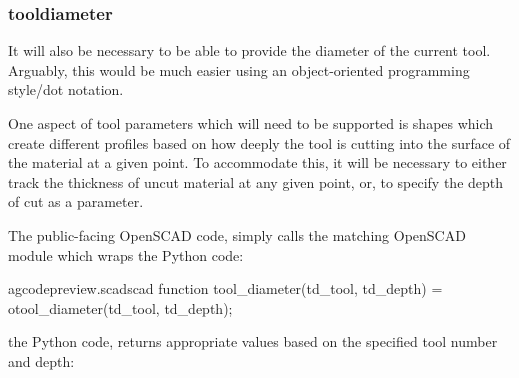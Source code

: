 \documentclass{ltxdoc}
\begin{document}
\subsubsection{tooldiameter}

It will also be necessary to be able to provide the diameter of the current tool. Arguably, this would be much easier using an object-oriented programming style/dot notation.

One aspect of tool parameters which will need to be supported is shapes which create different profiles based on how deeply the tool is cutting into the surface of the material at a given point. To accommodate this, it will be necessary to either track the thickness of uncut material at any given point, or, to specify the depth of cut as a parameter.


The public-facing OpenSCAD code,  simply calls the matching OpenSCAD module which wraps the Python code:
 
\lstset{firstnumber=\thegcpscad}
\begin{writecode}{a}{gcodepreview.scad}{scad}
function tool_diameter(td_tool, td_depth) = otool_diameter(td_tool, td_depth);

\end{writecode}
\addtocounter{gcpscad}{2}

\noindent the Python code,  returns 
appropriate values based on the specified tool number and depth:
 
\end{document}
